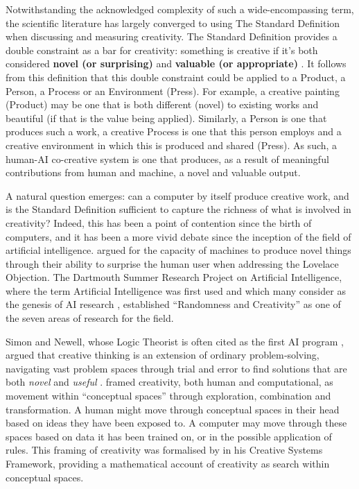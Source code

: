 Notwithstanding the acknowledged complexity of such a wide-encompassing term, the scientific literature has largely converged to using The Standard Definition when discussing and measuring creativity. The Standard Definition provides a double constraint as a bar for creativity: something is creative if it's both considered \textbf{novel (or surprising)} and \textbf{valuable (or appropriate)} \citep{Amabile1983-lj, Sternberg1998-oz, Runco2012-mk, Boden2003-hk}. It follows from this definition that this double constraint could be applied to a Product, a Person, a Process or an Environment (Press). For example, a creative painting (Product) may be one that is both different (novel) to existing works and beautiful (if that is the value being applied). Similarly, a Person is one that produces such a work, a creative Process is one that this person employs and a creative environment in which this is produced and shared (Press). As such, a human-AI co-creative system is one that produces, as a result of meaningful contributions from human and machine, a novel and valuable output. 

A natural question emerges: can a computer by itself produce creative work, and is the Standard Definition sufficient to capture the richness of what is involved in creativity? Indeed, this has been a point of contention since the birth of computers, and it has been a more vivid debate since the inception of the field of artificial intelligence. \citet{Turing1950-aq} argued for the capacity of machines to produce novel things through their ability to surprise the human user when addressing the Lovelace Objection. The Dartmouth Summer Research Project on Artificial Intelligence, where the term Artificial Intelligence was first used and which many consider as the genesis of AI research \citep{McCarthy1955-ls}, established ``Randomness and Creativity'' as one of the seven areas of research for the field. 

Simon and Newell, whose Logic Theorist is often cited as the first AI program \citep{Russell2016-oe}, argued that creative thinking is an extension of ordinary problem‑solving, navigating vast problem spaces through trial and error to find solutions that are both \textit{novel} and \textit{useful} \citep{Simon1967-nr}. \citet{Boden2003-hk} framed creativity, both human and computational, as movement within ``conceptual spaces'' through exploration, combination and transformation. A human might move through conceptual spaces in their head based on ideas they have been exposed to. A computer may move through these spaces based on data it has been trained on, or in the possible application of rules. This framing of creativity was formalised by \citet{Wiggins2006-zd} in his Creative Systems Framework, providing a mathematical account of creativity as search within conceptual spaces.

